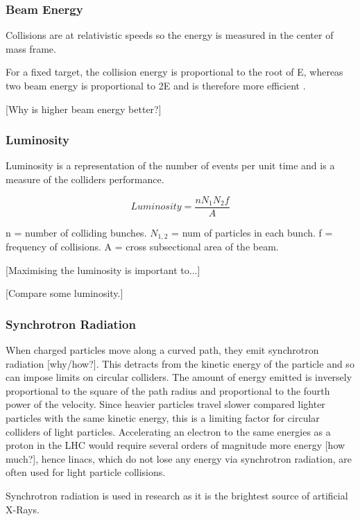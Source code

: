  \subsubsection{Beam Energy}
 
 Collisions are at relativistic speeds so the energy is measured in the center of mass frame.
 
 For a fixed target, the collision energy is proportional to the root of E, whereas two beam energy is proportional to 2E and is therefore more efficient \cite{ITP_Energy}.
 
 [Why is higher beam energy better?]
 
 \subsubsection{Luminosity}
 
 Luminosity is a representation of the number of events per unit time and is a measure of the colliders performance. 
 
 $$
 Luminosity = \frac{n N_1 N_2 f}{A}
 $$
 
 n = number of colliding bunches. $N_{1,2}$ = num of particles in each bunch. f = frequency of collisions. A = cross subsectional area of the beam.
 
 [Maximising the luminosity is important to...]
 
 [Compare some luminosity.]
 
 \subsubsection{Synchrotron Radiation}
 
 When charged particles move along a curved path, they emit synchrotron radiation [why/how?]. This detracts from the kinetic energy of the particle and so can impose limits on circular colliders. 
 The amount of energy emitted is inversely proportional to the square of the path radius and proportional to the fourth power of the velocity.  
 Since heavier particles travel slower compared lighter particles with the same kinetic energy, this is a limiting factor for circular colliders of light particles. Accelerating an electron to the same energies as a proton in the LHC would require several orders of magnitude more energy [how much?], hence linacs, which do not lose any energy via synchrotron radiation, are often used for light particle collisions.
 
 Synchrotron radiation is used in research as it is the brightest source of artificial X-Rays.
 
